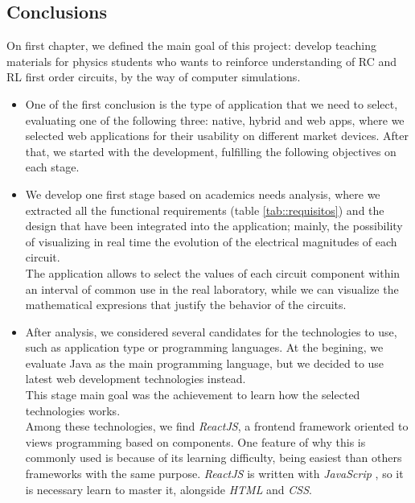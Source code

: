 \documentclass[../main.tex]{subfiles}
\begin{document}
\subsection{Conclusions}

On first chapter, we defined the main goal of this project: develop teaching materials for physics students who wants to reinforce understanding of RC and RL first order circuits, by the way of computer simulations.\\ 




\begin{itemize}
    
    \item One of the first conclusion is the type of application that we need to select, evaluating one of the following three: native, hybrid and web apps, where we selected web applications for their usability on different market devices. After that, we started with the development, fulfilling the following objectives on each stage.
    
    \item We develop one first stage based on academics needs analysis, where we extracted all the functional requirements (table \ref{tab::requisitos}) and the design that have been integrated into the application;  mainly, the possibility of visualizing in real time the evolution of the electrical magnitudes of each circuit.\\
    
    The application allows to select the values of each circuit component within an interval of common use in the real laboratory, while we can visualize the mathematical expresions that justify the behavior of the circuits.

    \item After analysis, we considered several candidates for the technologies to use, such as application type or programming languages. At the begining, we evaluate Java as the main programming language, but we decided to use latest web development technologies instead.\\
    
    This stage main goal was the achievement to learn how the selected technologies works.\\ 

    Among these technologies, we find \textit{ReactJS}, a frontend framework oriented to views programming based on components. One feature of why this is commonly used is because of its learning difficulty, being easiest than others frameworks with the same purpose. \textit{ReactJS} is written with \textit{JavaScrip
    }, so it is necessary learn to master it, alongside \textit{HTML} and \textit{CSS}.


\end{itemize}
\end{document}
